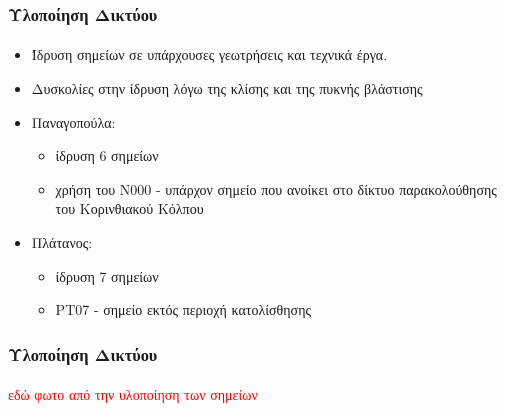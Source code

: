 \documentclass{beamer}
\begin{document}
\begin{frame}\frametitle{Υλοποίηση Δικτύου}\framesubtitle{}
\begin{itemize}
	\item Ίδρυση σημείων σε υπάρχουσες γεωτρήσεις και τεχνικά έργα.
	\item Δυσκολίες στην ίδρυση λόγω της κλίσης και της πυκνής βλάστισης
	\item  Παναγοπούλα:
	\begin{itemize}
		\item ίδρυση 6 σημείων
		\item χρήση του Ν000 - υπάρχον σημείο που ανοίκει στο δίκτυο παρακολούθησης του Κορινθιακού Κόλπου
	\end{itemize}
	\item Πλάτανος:
	\begin{itemize}
		\item ίδρυση 7 σημείων
		\item PT07 - σημείο εκτός περιοχή κατολίσθησης
	\end{itemize}
\end{itemize}
\end{frame}

\begin{frame}\frametitle{Υλοποίηση Δικτύου}\framesubtitle{}
\textcolor{red}{εδώ φωτο από την υλοποίηση των σημείων}
\end{frame}
\end{document}
